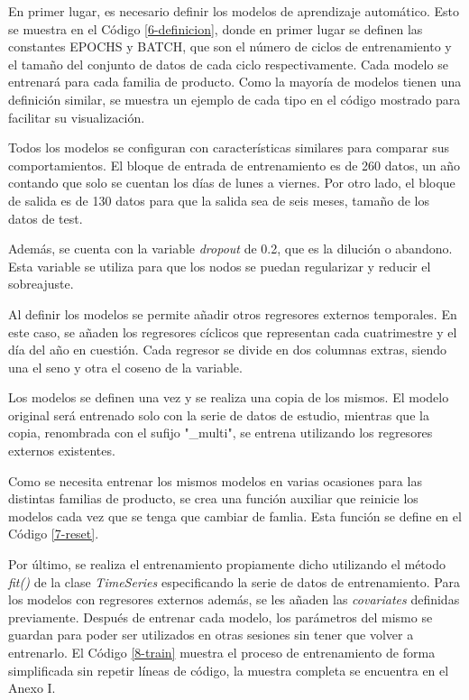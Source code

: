 En primer lugar, es necesario definir los modelos de aprendizaje automático. Esto se muestra en el Código \ref*{6-definicion}, donde en primer lugar se definen las constantes EPOCHS y BATCH, que son el número de ciclos de entrenamiento y el tamaño del conjunto de datos de cada ciclo respectivamente. Cada modelo se entrenará para cada familia de producto. Como la mayoría de modelos tienen una definición similar, se muestra un ejemplo de cada tipo en el código mostrado para facilitar su visualización.

Todos los modelos se configuran con características similares para comparar sus comportamientos. El bloque de entrada de entrenamiento es de 260 datos, un año contando que solo se cuentan los días de lunes a viernes. Por otro lado, el bloque de salida es de 130 datos para que la salida sea de seis meses, tamaño de los datos de test.

Además, se cuenta con la variable \textit{dropout} de 0.2, que es la dilución o abandono. Esta variable se utiliza para que los nodos se puedan regularizar y reducir el sobreajuste.

Al definir los modelos se permite añadir otros regresores externos temporales. En este caso, se añaden los regresores cíclicos que representan cada cuatrimestre y el día del año en cuestión. Cada regresor se divide en dos columnas extras, siendo una el seno y otra el coseno de la variable.

Los modelos se definen una vez y se realiza una copia de los mismos. El modelo original será entrenado solo con la serie de datos de estudio, mientras que la copia, renombrada con el sufijo "\_multi", se entrena utilizando los regresores externos existentes.



Como se necesita entrenar los mismos modelos en varias ocasiones para las distintas familias de producto, se crea una función auxiliar que reinicie los modelos cada vez que se tenga que cambiar de famlia. Esta función se define en el Código \ref*{7-reset}.



Por último, se realiza el entrenamiento propiamente dicho utilizando el método \textit{fit()} de la clase \textit{TimeSeries} especificando la serie de datos de entrenamiento. Para los modelos con regresores externos además, se les añaden las \textit{covariates} definidas previamente. Después de entrenar cada modelo, los parámetros del mismo se guardan para poder ser utilizados en otras sesiones sin tener que volver a entrenarlo. El Código \ref{8-train} muestra el proceso de entrenamiento de forma simplificada sin repetir líneas de código, la muestra completa se encuentra en el Anexo I.

